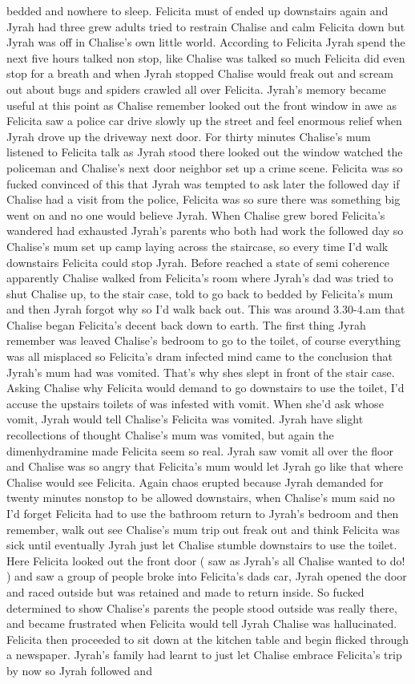 \documentclass[12pt]{book}
\begin{document}
bedded and nowhere to sleep. Felicita must of ended up downstairs again and Jyrah had three grew adults tried to restrain Chalise and calm Felicita down but Jyrah was off in Chalise's own little world. According to Felicita Jyrah spend the next five hours talked non stop, like Chalise was talked so much Felicita did even stop for a breath and when Jyrah stopped Chalise would freak out and scream out about bugs and spiders crawled all over Felicita. Jyrah's memory became useful at this point as Chalise remember looked out the front window in awe as Felicita saw a police car drive slowly up the street and feel enormous relief when Jyrah drove up the driveway next door. For thirty minutes Chalise's mum listened to Felicita talk as Jyrah stood there looked out the window watched the policeman and Chalise's next door neighbor set up a crime scene. Felicita was so fucked convinced of this that Jyrah was tempted to ask later the followed day if Chalise had a visit from the police, Felicita was so sure there was something big went on and no one would believe Jyrah. When Chalise grew bored Felicita's wandered had exhausted Jyrah's parents who both had work the followed day so Chalise's mum set up camp laying across the staircase, so every time I'd walk downstairs Felicita could stop Jyrah. Before reached a state of semi coherence apparently Chalise walked from Felicita's room where Jyrah's dad was tried to shut Chalise up, to the stair case, told to go back to bedded by Felicita's mum and then Jyrah forgot why so I'd walk back out. This was around 3.30-4.am that Chalise began Felicita's decent back down to earth. The first thing Jyrah remember was leaved Chalise's bedroom to go to the toilet, of course everything was all misplaced so Felicita's dram infected mind came to the conclusion that Jyrah's mum had was vomited. That's why shes slept in front of the stair case. Asking Chalise why Felicita would demand to go downstairs to use the toilet, I'd accuse the upstairs toilets of was infested with vomit. When she'd ask whose vomit, Jyrah would tell Chalise's Felicita was vomited. Jyrah have slight recollections of thought Chalise's mum was vomited, but again the dimenhydramine made Felicita seem so real. Jyrah saw vomit all over the floor and Chalise was so angry that Felicita's mum would let Jyrah go like that where Chalise would see Felicita. Again chaos erupted because Jyrah demanded for twenty minutes nonstop to be allowed downstairs, when Chalise's mum said no I'd forget Felicita had to use the bathroom return to Jyrah's bedroom and then remember, walk out see Chalise's mum trip out freak out and think Felicita was sick until eventually Jyrah just let Chalise stumble downstairs to use the toilet. Here Felicita looked out the front door ( saw as Jyrah's all Chalise wanted to do! ) and saw a group of people broke into Felicita's dads car, Jyrah opened the door and raced outside but was retained and made to return inside. So fucked determined to show Chalise's parents the people stood outside was really there, and became frustrated when Felicita would tell Jyrah Chalise was hallucinated. Felicita then proceeded to sit down at the kitchen table and begin flicked through a newspaper. Jyrah's family had learnt to just let Chalise embrace Felicita's trip by now so Jyrah followed and 
\end{document}
